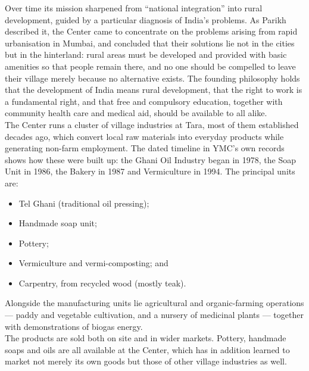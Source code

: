 \documentclass[a4paper, 11pt]{article}
\begin{document}
		Over time its mission sharpened from ``national integration'' into rural development, guided by a particular diagnosis of India's problems. As Parikh described it, the Center came to concentrate on the problems arising from rapid urbanisation in Mumbai, and concluded that their solutions lie not in the cities but in the hinterland: rural areas must be developed and provided with basic amenities so that people remain there, and no one should be compelled to leave their village merely because no alternative exists. The founding philosophy holds that the development of India means rural development, that the right to work is a fundamental right, and that free and compulsory education, together with community health care and medical aid, should be available to all alike.\\
		
		The Center runs a cluster of village industries at Tara, most of them established decades ago, which convert local raw materials into everyday products while generating non-farm employment. The dated timeline in YMC's own records shows how these were built up: the Ghani Oil Industry began in 1978, the Soap Unit in 1986, the Bakery in 1987 and Vermiculture in 1994. The principal units are:%
%		
		\begin{itemize}
			
			\item Tel Ghani (traditional oil pressing);
			
			\item Handmade soap unit;
			
			\item Pottery;
			
			\item Vermiculture and vermi-composting; and
			
			\item Carpentry, from recycled wood (mostly teak).
			
		\end{itemize}
		
		Alongside the manufacturing units lie agricultural and organic-farming operations --- paddy and vegetable cultivation, and a nursery of medicinal plants --- together with demonstrations of biogas energy.\\
		
		The products are sold both on site and in wider markets. Pottery, handmade soaps and oils are all available at the Center, which has in addition learned to market not merely its own goods but those of other village industries as well.\\
		
\end{document}
